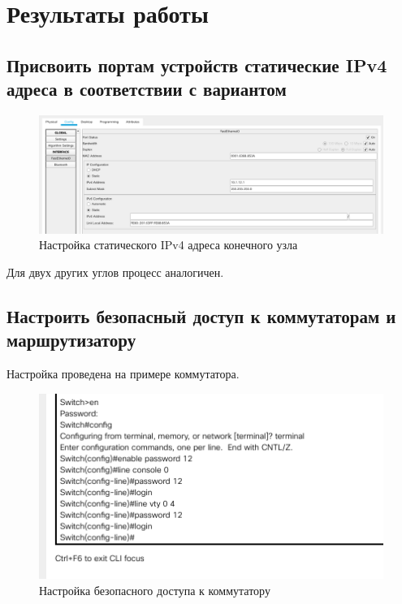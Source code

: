 \documentclass[12pt]{report}
\begin{document}
\section*{Результаты работы}

\subsection*{Присвоить портам устройств статические IPv4 адреса в соответствии с вариантом}

\begin{figure}[H]
	\begin{center}
		\includegraphics[scale=0.4]{img/1.png}
	\end{center}
	\caption{Настройка статического IPv4 адреса конечного узла}
	\label{fig:1}
\end{figure}

Для двух других углов процесс аналогичен.

\subsection*{Настроить безопасный доступ к коммутаторам и маршрутизатору}

Настройка проведена на примере коммутатора.

\begin{figure}[H]
	\begin{center}
		\includegraphics[scale=0.7]{img/2.png}
	\end{center}
	\caption{Настройка безопасного доступа к коммутатору}
	\label{fig:2}
\end{figure}
\end{document}
